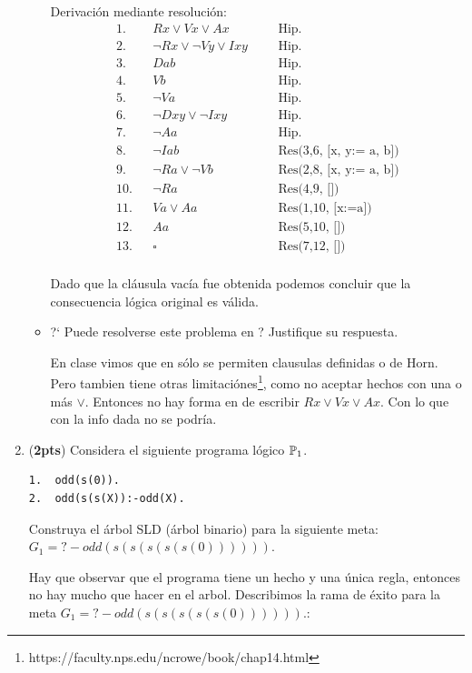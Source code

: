 \documentclass[11pt,letterpaper]{article}
\begin{document}
\begin{enumerate}
\begin{itemize}
  Derivación mediante resolución:
  \begin{align*}
    1.& & Rx\lor Vx\lor Ax& &  &\text{Hip.}\\
    2.& & \neg Rx\lor\neg Vy \lor Ixy& & &\text{Hip.}\\
    3.& & Dab& &  &\text{Hip.}\\
    4.& & Vb & & &\text{Hip.}\\
    5.& & \neg Va& & &\text{Hip.}\\
    6.& & \neg Dxy\lor \neg Ixy& & &\text{Hip.}\\
    7.& & \neg Aa & & &\text{Hip.}\\
    8.& & \neg Iab & & &\text{Res(3,6, [x, y:= a, b])}\\
    9.& &  \neg Ra\lor\neg Vb& & &\text{Res(2,8, [x, y:= a, b])}\\
    10.& &  \neg Ra& & &\text{Res(4,9, [])}\\
    11.& &  Va\lor Aa& & &\text{Res(1,10, [x:=a])}\\
    12.& &  Aa& & &\text{Res(5,10, [])}\\
    13.& &  \square& & &\text{Res(7,12, [])}\\
  \end{align*}

  Dado que la cláusula vacía fue obtenida podemos concluir que la consecuencia lógica original es válida.
\item ?` Puede resolverse este problema en {\pl} ? Justifique su respuesta.

  \hfill\break
  En clase vimos que en {\pl} sólo se permiten clausulas definidas o de
  Horn. Pero tambien tiene otras limitaciónes\footnote{https://faculty.nps.edu/ncrowe/book/chap14.html}, como no aceptar hechos con una o más $\lor$. Entonces no hay forma en {\pl}
  de escribir $Rx\lor Vx\lor Ax$. Con lo que con la info dada no se podría.
\end{itemize}

\medskip
\newpage
\item (\textbf{2pts}) Considera el siguiente programa lógico $\P_{1}$.
\begin{verbatim}
1.  odd(s(0)).                            
2.  odd(s(s(X)):-odd(X).    
\end{verbatim}

Construya el árbol SLD (\'arbol binario) para la siguiente meta:
$ G_{1}=?-odd(s(s(s(s(s(0)))))). $

Hay que observar que el programa tiene un hecho y una única
regla, entonces no hay mucho que hacer en el arbol. Describimos
la rama de éxito para la meta $ G_{1}=?-odd(s(s(s(s(s(0)))))). $:


\end{enumerate}
\end{document}
